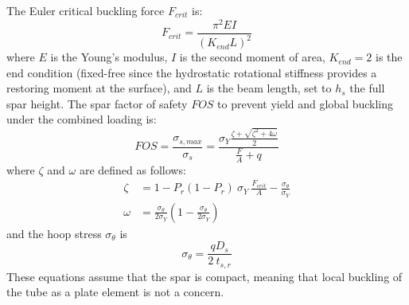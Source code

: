 The Euler critical buckling force $F_{crit}$ is:
\begin{equation}
    F_{crit} = \frac{\pi^2 E I}{(K_{end} L)^2}
\end{equation}
where $E$ is the Young's modulus, $I$ is the second moment of area, $K_{end}=2$ is the end condition (fixed-free since the hydrostatic rotational stiffness provides a restoring moment at the surface), and $L$ is the beam length, set to $h_s$ the full spar height.
The spar factor of safety $FOS$ to prevent yield and global buckling under the combined loading is:
\begin{equation}
    FOS = \frac{\sigma_{s,max}}{\sigma_s} = \frac{\sigma_Y \frac{\zeta + \sqrt{\zeta^2+4\omega}}{2}}{\frac{F}{A} + q}
\end{equation}
where $\zeta$ and $\omega$ are defined as follows:
\begin{equation}
\begin{aligned}
     \zeta &= 1 - P_r(1 - P_r)~\sigma_Y~\frac{F_{crit}}{A} - \frac{\sigma_\theta}{\sigma_Y} \\
    \omega &= \frac{\sigma_\theta}{2\sigma_Y}  (1 - \frac{\sigma_\theta}{2\sigma_Y})
\end{aligned}
\end{equation}
and the hoop stress $\sigma_\theta$ is 
\begin{equation}
     \sigma_\theta = \frac{qD_s}{2~t_{s,r}}
\end{equation}
These equations assume that the spar is compact, meaning that local buckling of the tube as a plate element is not a concern.

\clearpage
